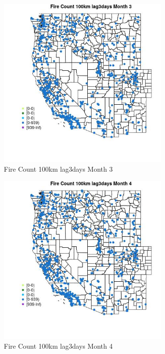 \begin{figure} 
\centering  
\includegraphics[width=0.77\textwidth]{Code_Outputs/Report_ML_input_PM25_Step4_part_e_de_duplicated_aves_compiled_2019-05-21wNAs_MapObsMo3Fire_Count_100km_lag3days.jpg} 
\caption{\label{fig:Report_ML_input_PM25_Step4_part_e_de_duplicated_aves_compiled_2019-05-21wNAsMapObsMo3Fire_Count_100km_lag3days}Fire Count 100km lag3days Month 3} 
\end{figure} 
 

\begin{figure} 
\centering  
\includegraphics[width=0.77\textwidth]{Code_Outputs/Report_ML_input_PM25_Step4_part_e_de_duplicated_aves_compiled_2019-05-21wNAs_MapObsMo4Fire_Count_100km_lag3days.jpg} 
\caption{\label{fig:Report_ML_input_PM25_Step4_part_e_de_duplicated_aves_compiled_2019-05-21wNAsMapObsMo4Fire_Count_100km_lag3days}Fire Count 100km lag3days Month 4} 
\end{figure} 
 

